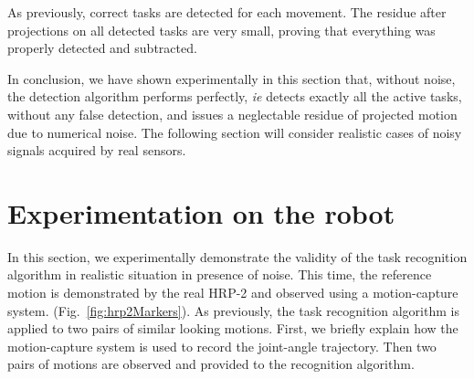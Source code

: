 \documentclass[journal]{IEEEtran}
\begin{document}
As previously, correct tasks are detected for each movement. The residue after projections on all detected
tasks are very small, proving that everything was properly detected and subtracted.

In conclusion, we have shown experimentally in this section that, without noise, the detection algorithm
performs perfectly, \emph{ie} detects exactly all the active tasks, without any  false detection,
and issues a neglectable residue of projected motion due to numerical noise. The following section will consider
realistic cases of noisy signals acquired by real sensors.

\section{Experimentation on the robot}
\label{sec:real}
In this section, we experimentally demonstrate the validity of the task recognition algorithm
in realistic situation in presence of noise. This time, the reference motion
is demonstrated by the real HRP-2 and observed
using a motion-capture system. (Fig.~\ref{fig:hrp2Markers}).
As previously, the task recognition algorithm is applied to two pairs of similar looking motions.
First, we briefly explain how the motion-capture system is used to record the joint-angle
trajectory. Then two pairs of motions are observed and provided to the recognition algorithm.
\end{document}
